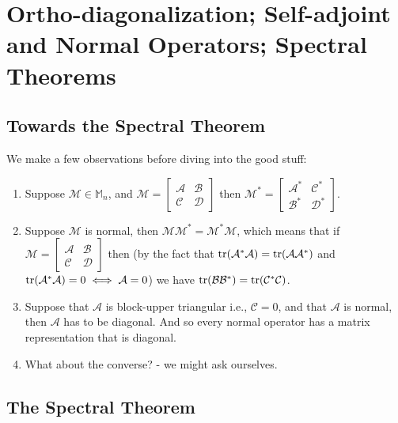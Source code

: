 \documentclass{book}
\theoremstyle{definition}
\newcommand{\A}{\mathcal{A}}
\newcommand{\B}{\mathcal{B}}
\newcommand{\M}{\mathcal{M}}
\begin{document}
\newpage 

\chapter{Ortho-diagonalization; Self-adjoint and Normal Operators; Spectral Theorems}

\section{Towards the Spectral Theorem}
We make a few observations before diving into the good stuff:
\begin{enumerate}
	\item Suppose $\M \in \mathbb{M}_n$, and $\M = \begin{bmatrix}
	\A & \B \\ \mathcal{C} & \mathcal{D}
	\end{bmatrix}$ then $\M^* = \begin{bmatrix}
	\A^* & \mathcal{C}^* \\ \B^* & \mathcal{D}^*
	\end{bmatrix}$. 
	
	\item Suppose $\M$ is normal, then $\M\M^* = \M^* \M$, which means that if $\M = \begin{bmatrix}
	\A & \B \\ \mathcal{C} & \mathcal{D}
	\end{bmatrix}$ 
	then (by the fact that $\tr(\A^*\A) = \tr(\A\A^*)$ and $\tr(\A^*\A) = 0 \iff \A=0$) we have $\tr(\B\B^*) = \tr(\mathcal{C}^*\mathcal{C})$.
	
	\item Suppose that $\A$ is block-upper triangular i.e., $\mathcal{C} = 0$, and that $\A$ is normal, then $\A$ has to be diagonal. And so every normal operator has a matrix representation that is diagonal. 
	
	\item What about the converse? - we might ask ourselves. 
\end{enumerate}



\section{The Spectral Theorem}
\end{document}
